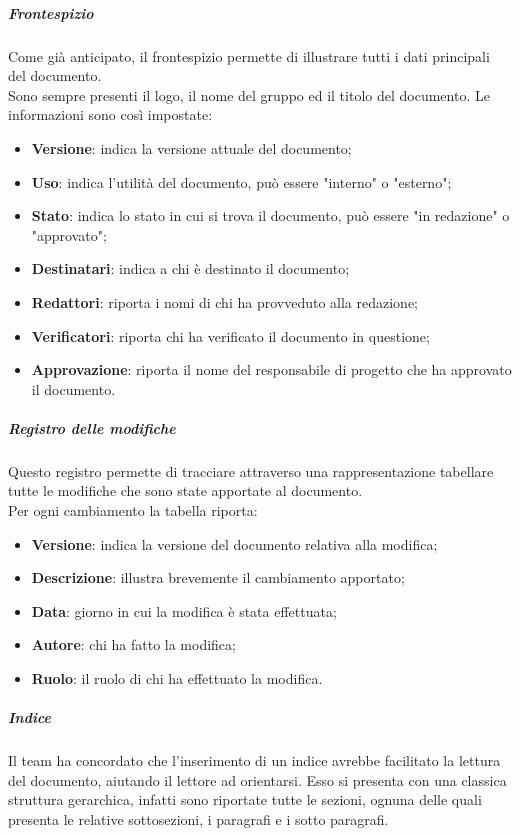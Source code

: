 \subparagraph{Frontespizio}
Come già anticipato, il frontespizio permette di illustrare tutti i dati principali del documento.\\
Sono sempre presenti il logo, il nome del gruppo ed il titolo del documento.
Le informazioni sono così impostate:
\begin{itemize}
	\item\textbf{Versione}: indica la versione attuale del documento;
	\item\textbf{Uso}: indica l'utilità del documento, può essere "interno" o "esterno";
	\item\textbf{Stato}: indica lo stato in cui si trova il documento, può essere "in redazione" o "approvato";
	\item\textbf{Destinatari}: indica a chi è destinato il documento;
	\item\textbf{Redattori}: riporta i nomi di chi ha provveduto alla redazione;
	\item\textbf{Verificatori}: riporta chi ha verificato il documento in questione;
	\item\textbf{Approvazione}: riporta il nome del responsabile di progetto che ha approvato il documento.
\end{itemize}

\subparagraph{Registro delle modifiche}
Questo registro permette di tracciare attraverso una rappresentazione tabellare tutte le modifiche che sono state apportate al documento. \\
Per ogni cambiamento la tabella riporta:
\begin{itemize}
	\item\textbf{Versione}: indica la versione del documento relativa alla modifica;
	\item\textbf{Descrizione}: illustra brevemente il cambiamento apportato;
	\item\textbf{Data}: giorno in cui la modifica è stata effettuata;
	\item\textbf{Autore}: chi ha fatto la modifica;
	\item\textbf{Ruolo}: il ruolo di chi ha effettuato la modifica.
\end{itemize}

\subparagraph{Indice}
Il team ha concordato che l'inserimento di un indice avrebbe facilitato la lettura del documento, aiutando il lettore ad orientarsi.
Esso si presenta con una classica struttura gerarchica, infatti sono riportate tutte le sezioni, ognuna delle quali presenta le relative sottosezioni, i paragrafi e i sotto paragrafi.

